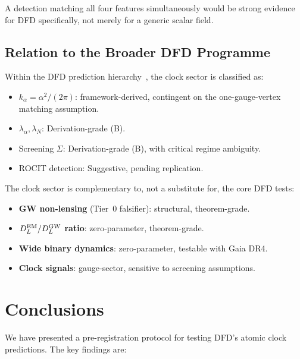 \documentclass[twocolumn,showpacs,preprintnumbers,amsmath,amssymb,prd]{revtex4-2}
\newcommand{\kalpha}{k_\alpha}
\begin{document}
A detection matching all four features simultaneously would be
strong evidence for DFD specifically, not merely for a generic
scalar field.

\subsection{Relation to the Broader DFD Programme}

Within the DFD prediction hierarchy~\cite{Alcock2025_DFD_v32},
the clock sector is classified as:
\begin{itemize}
\item $\kalpha = \alpha^2/(2\pi)$: framework-derived, contingent on
  the one-gauge-vertex matching assumption.
\item $\lambda_\alpha, \lambda_N$: Derivation-grade (B).
\item Screening $\Sigma$: Derivation-grade (B), with critical
  regime ambiguity.
\item ROCIT detection: Suggestive, pending replication.
\end{itemize}

The clock sector is complementary to, not a substitute for, the
core DFD tests:
\begin{itemize}
\item \textbf{GW non-lensing} (Tier~0 falsifier): structural,
  theorem-grade.
\item \textbf{$D_L^{\rm EM}/D_L^{\rm GW}$ ratio}: zero-parameter,
  theorem-grade.
\item \textbf{Wide binary dynamics}: zero-parameter, testable with
  Gaia DR4.
\item \textbf{Clock signals}: gauge-sector, sensitive to screening
  assumptions.
\end{itemize}

\section{Conclusions}\label{sec:conclusions}

We have presented a pre-registration protocol for testing DFD's
atomic clock predictions.  The key findings are:
\end{document}
